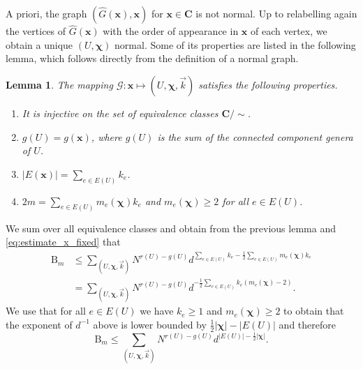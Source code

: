 \documentclass[11pt]{article}
\newcommand{\abs}[1]{\left| #1 \right|}
\newcommand{\patx}{\boldsymbol{x}}
\newcommand{\patchi}{\boldsymbol{\chi}}
\theoremstyle{plain}
\newtheorem{lemma}{Lemma}[section]
\theoremstyle{remark}
\numberwithin{equation}{section}
\begin{document}
A priori, the graph $(\hat{G}(\patx), \patx)$ for $\patx \in \boldsymbol C$ is not normal. Up to relabelling again the vertices of $\hat{G}(\patx)$ with the order of appearance in $\patx$ of each vertex, we obtain a unique $(U,\patchi) $ normal. Some of its properties are listed in the following lemma, which follows directly from the definition of a normal graph. 
\begin{lemma}\label{lem:eq_of_lem5.7}
The mapping $\mathcal G :\patx \mapsto (U, \patchi,\vec{k}) $ satisfies the following properties. 
\begin{enumerate}[label=(\alph*)] 
    \item It is injective on the set of equivalence classes $\boldsymbol C/\sim$.
    \item $g(U) = g(\patx)$, where $g(U)$ is the sum of the connected component genera of $U$.
    \item $\abs{E(\patx)} = \sum_{e\in E(U)} k_{e}$.
    \item $2m= \sum_{e \in E(U)}m_e(\patchi)k_e$ and $m_{e}(\patchi) \ge 2$ for all $e \in E(U)$.
\end{enumerate}

\end{lemma}
We sum over all equivalence classes and obtain from the previous lemma and \eqref{eq:estimate_x_fixed} that 
\begin{align*}
    \mathrm{B}_{m} &\le \sum_{(U,\patchi,\vec{k})} N^{r(U)-g(U)} d^{ \sum_{e \in E(U)} k_e - \frac{1}{2}\sum_{e\in E(U)} m_{e}(\patchi)k_e} \\
    &= \sum_{(U,\patchi,\vec{k})} N^{r(U)-g(U)} d^{- \frac{1}{2}\sum_{e \in E(U)} k_e(  m_{e}(\patchi)-2)}.
\end{align*}
	We use that for all $e \in E(U)$ we have $k_e \ge 1$ and $m_{e}(\patchi) \ge 2$ to obtain that the exponent of  $d^{-1} $ above is lower bounded by $\frac{1}{2}|\patchi| - |E(U)|$ and therefore
	\begin{equation*}
	        \mathrm{B}_{m} \le \sum_{(U,\patchi,\vec{k})} N^{r(U)-g(U)} d^{|E(U)| - \frac{1}{2}|\patchi|} .
	\end{equation*}
\end{document}
